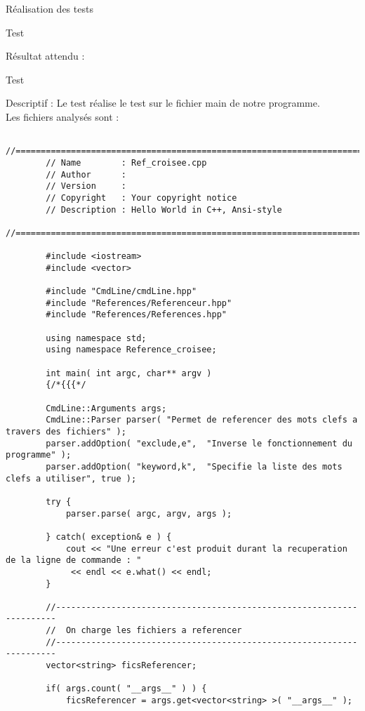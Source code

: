 \documentclass{article}
\begin{document}
\begin{section}{Réalisation des tests}
\begin{subsection}{Test }
\begin{paragraph}{Résultat attendu :}
\begin{listing}[h!]
      \end{listing}
    \end{paragraph}

  \end{subsection}

   \newpage 
  \begin{subsection}{Test }
    
    \begin{paragraph}{Descriptif :}
	Le test  réalise le test sur le fichier main de notre programme.\\ Les fichiers analysés sont : 
      
      \begin{verbatim}
	    //============================================================================
	    // Name        : Ref_croisee.cpp
	    // Author      :
	    // Version     :
	    // Copyright   : Your copyright notice
	    // Description : Hello World in C++, Ansi-style
	    //============================================================================

	    #include <iostream>
	    #include <vector>

	    #include "CmdLine/cmdLine.hpp"
	    #include "References/Referenceur.hpp"
	    #include "References/References.hpp"

	    using namespace std;
	    using namespace Reference_croisee;

	    int main( int argc, char** argv )
	    {/*{{{*/

		CmdLine::Arguments args;
		CmdLine::Parser parser( "Permet de referencer des mots clefs a travers des fichiers" );
		parser.addOption( "exclude,e",  "Inverse le fonctionnement du programme" );
		parser.addOption( "keyword,k",  "Specifie la liste des mots clefs a utiliser", true );

		try {
		    parser.parse( argc, argv, args );

		} catch( exception& e ) {
		    cout << "Une erreur c'est produit durant la recuperation de la ligne de commande : "
			 << endl << e.what() << endl;
		}

		//----------------------------------------------------------------------
		//  On charge les fichiers a referencer
		//----------------------------------------------------------------------
		vector<string> ficsReferencer;

		if( args.count( "__args__" ) ) {
		    ficsReferencer = args.get<vector<string> >( "__args__" );


\end{verbatim}
\end{paragraph}
\end{subsection}
\end{section}
\end{document}
